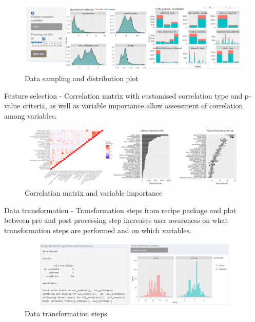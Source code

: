 \documentclass{acm_proc_article-sp}
\begin{document}
\begin{figure}[H]

{\centering \includegraphics[width=1\linewidth]{images/datasplit} 

}

\caption{Data sampling and distribution plot}\label{fig:unnamed-chunk-9}
\end{figure}

Feature selection - Correlation matrix with customised correlation type
and p-value criteria, as well as variable importance allow assessment of
correlation among variables.

\begin{figure}[H]

{\centering \includegraphics[width=1\linewidth]{images/featselect} 

}

\caption{Correlation matrix and variable importance}\label{fig:unnamed-chunk-10}
\end{figure}

Data transformation - Transformation steps from recipe package and plot
between pre and post processing step increases user awareness on what
transformation steps are performed and on which variables.

\begin{figure}[H]

{\centering \includegraphics[width=1\linewidth]{images/recipetrf} 

}

\caption{Data transformation steps}\label{fig:unnamed-chunk-11}
\end{figure}
\end{document}
